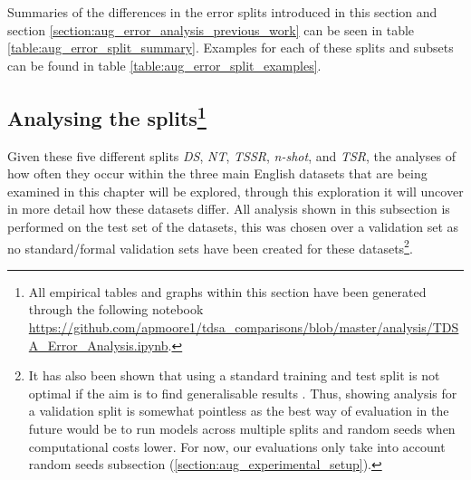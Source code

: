Summaries of the differences in the error splits introduced in this section and section \ref{section:aug_error_analysis_previous_work} can be seen in table \ref{table:aug_error_split_summary}. Examples for each of these splits and subsets can be found in table \ref{table:aug_error_split_examples}.


\newpage
\FloatBarrier
\subsection[Analysing the splits]{Analysing the splits\footnote{All empirical tables and graphs within this section have been generated through the following notebook \url{https://github.com/apmoore1/tdsa_comparisons/blob/master/analysis/TDSA_Error_Analysis.ipynb}.}}
\label{section:aug_analysing_the_splits}
Given these five different splits \textit{DS}, \textit{NT}, \textit{TSSR}, \textit{n-shot}, and \textit{TSR}, the analyses of how often they occur within the three main English datasets that are being examined in this chapter will be explored, through this exploration it will uncover in more detail how these datasets differ. All analysis shown in this subsection is performed on the test set of the datasets, this was chosen over a validation set as no standard/formal validation sets have been created for these datasets\footnote{It has also been shown that using a standard training and test split is not optimal if the aim is to find generalisable results \citep{gorman-bedrick-2019-need,moss-etal-2019-fiesta}. Thus, showing analysis for a validation split is somewhat pointless as the best way of evaluation in the future would be to run models across multiple splits and random seeds \citep{moss-etal-2019-fiesta} when computational costs lower. For now, our evaluations only take into account random seeds subsection (\ref{section:aug_experimental_setup}).}.


